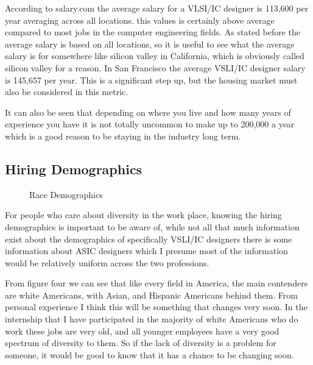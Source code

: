 \documentclass{article}
\begin{document}
According to salary.com the average salary for a VLSI/IC designer is 113,600 per year averaging across all locations. this values is certainly above average compared to most jobs in the computer engineering fields. As stated before the average salary is based on all locations, so it is useful to see what the average salary is for somewhere like silicon valley in California, which is obviously called silicon valley for a reason. In San Francisco the average VSLI/IC designer salary is 145,657 per year. This is a significant step up, but the housing market must also be considered in this metric.

It  can also be seen that depending on where you live and how many years of experience you have it is not totally uncommon to make up to 200,000 a year which is a good reason to be staying in the industry long term.
\subsection*{Hiring Demographics}
\begin{figure}
  \begin{center}
  \end{center}
  \caption{Race Demographics}
\end{figure}
For people who care about diversity in the work place, knowing the hiring demographics is important to be aware of, while not all that much information exist about the demographics of specifically VSLI/IC designers there is some information about ASIC designers which I presume most of the information would be relatively uniform across the two professions.  

From figure four we can see that like every field in America, the main contenders are white Americans, with Asian, and Hispanic Americans behind them. From personal experience I think this will be something that changes very soon. In the internship that I have participated in the majority of white Americans who do work these jobs are very old, and all younger employees have a very good spectrum of diversity to them. So if the lack of diversity is a problem for someone, it would be good to know that it has a chance to be changing soon.
\end{document}
